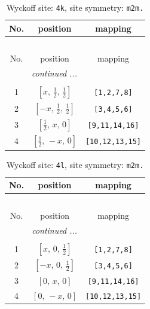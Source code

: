 \documentclass[fleqn,8pt]{jsarticle}
\begin{document}
\renewcommand{\arraystretch}{1.2}
\begin{longtable}{ccc}
\caption{Wyckoff site: {\tt 4k}, site symmetry: {\tt m2m.}}
 \\
 \hline \hline
No. & position & mapping \\ \hline \endfirsthead

\multicolumn{2}{l}{\tablename\ \thetable{}} \\
 \hline \hline
No. & position & mapping \\ \hline \endhead

 \hline \hline
\multicolumn{2}{r}{\footnotesize\it continued ...} \\ \endfoot

 \hline \hline
\multicolumn{2}{r}{} \\ \endlastfoot

1 & $\left[ x,\, \frac{1}{2},\, \frac{1}{2} \right]$ & {\tt [1,2,7,8]} \\ \hline
2 & $\left[ - x,\, \frac{1}{2},\, \frac{1}{2} \right]$ & {\tt [3,4,5,6]} \\ \hline
3 & $\left[ \frac{1}{2},\, x,\, 0 \right]$ & {\tt [9,11,14,16]} \\ \hline
4 & $\left[ \frac{1}{2},\, - x,\, 0 \right]$ & {\tt [10,12,13,15]} \\
\end{longtable}
\renewcommand{\arraystretch}{1.2}
\begin{longtable}{ccc}
\caption{Wyckoff site: {\tt 4l}, site symmetry: {\tt m2m.}}
 \\
 \hline \hline
No. & position & mapping \\ \hline \endfirsthead

\multicolumn{2}{l}{\tablename\ \thetable{}} \\
 \hline \hline
No. & position & mapping \\ \hline \endhead

 \hline \hline
\multicolumn{2}{r}{\footnotesize\it continued ...} \\ \endfoot

 \hline \hline
\multicolumn{2}{r}{} \\ \endlastfoot

1 & $\left[ x,\, 0,\, \frac{1}{2} \right]$ & {\tt [1,2,7,8]} \\ \hline
2 & $\left[ - x,\, 0,\, \frac{1}{2} \right]$ & {\tt [3,4,5,6]} \\ \hline
3 & $\left[ 0,\, x,\, 0 \right]$ & {\tt [9,11,14,16]} \\ \hline
4 & $\left[ 0,\, - x,\, 0 \right]$ & {\tt [10,12,13,15]} \\
\end{longtable}
\end{document}
